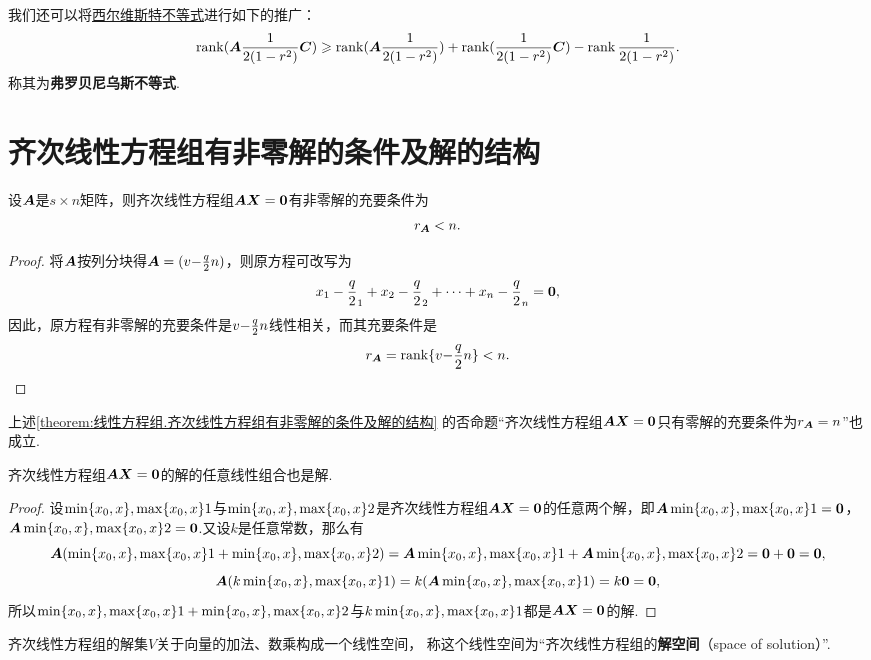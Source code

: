我们还可以将\hyperref[equation:线性方程组.西尔维斯特不等式]{西尔维斯特不等式}进行如下的推广：\begin{equation}\label{equation:线性方程组.弗罗贝尼乌斯不等式}
\rank(\A\B\C) \geqslant \rank(\A\B) + \rank(\B\C) - \rank\B.
\end{equation}称其为\textbf{弗罗贝尼乌斯不等式}.

\section{齐次线性方程组有非零解的条件及解的结构}
\begin{theorem}\label{theorem:线性方程组.齐次线性方程组有非零解的条件及解的结构}
设\(\A\)是\(s \times n\)矩阵，则齐次线性方程组\(\A\x=\z\)有非零解的充要条件为\[
r_{\A} < n.
\]
\begin{proof}
将\(\A\)按列分块得\(\A = (\v{\a}{n})\)，则原方程可改写为\[
x_1 \a_1 + x_2 \a_2 + \dotsb + x_n \a_n = \z,
\]因此，原方程有非零解的充要条件是\(\v{\a}{n}\)线性相关，而其充要条件是\[
r_{\A} = \rank\{\v{\a}{n}\} < n.
\qedhere
\]
\end{proof}
\end{theorem}

上述\cref{theorem:线性方程组.齐次线性方程组有非零解的条件及解的结构}
的否命题“齐次线性方程组\(\A\x=\z\)只有零解的充要条件为\(r_{\A}=n\)”也成立.

\begin{theorem}\label{theorem:线性方程组.齐次线性方程组的解的线性组合也是解}
齐次线性方程组\(\A\x=\z\)的解的任意线性组合也是解.
\begin{proof}
设\(\X1\)与\(\X2\)是齐次线性方程组\(\A \x = \z\)的任意两个解，即\(\A \X1 = \z\)，\(\A \X2 = \z\).又设\(k\)是任意常数，那么有\[
\A (\X1 + \X2) = \A \X1 + \A \X2 = \z + \z = \z,
\]\[
\A (k \X1) = k (\A \X1) = k \z = \z,
\]所以\(\X1 + \X2\)与\(k \X1\)都是\(\A \x = \z\)的解.
\end{proof}
\end{theorem}

\begin{definition}\label{definition:线性方程组.齐次线性方程组的解空间}
齐次线性方程组的解集\(V\)关于向量的加法、数乘构成一个线性空间，%
称这个线性空间为“齐次线性方程组的\textbf{解空间}（space of solution）”.
\end{definition}


